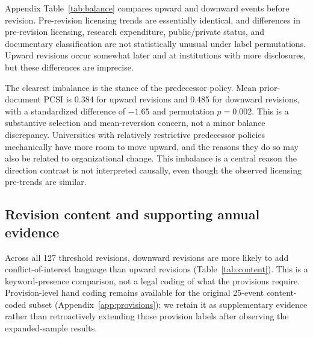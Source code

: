 Appendix Table~\ref{tab:balance} compares upward and downward events before revision. Pre-revision licensing trends are essentially identical, and differences in pre-revision licensing, research expenditure, public/private status, and documentary classification are not statistically unusual under label permutations. Upward revisions occur somewhat later and at institutions with more disclosures, but these differences are imprecise.

The clearest imbalance is the stance of the predecessor policy. Mean prior-document PCSI is 0.384 for upward revisions and 0.485 for downward revisions, with a standardized difference of $-1.65$ and permutation $p=0.002$. This is a substantive selection and mean-reversion concern, not a minor balance discrepancy. Universities with relatively restrictive predecessor policies mechanically have more room to move upward, and the reasons they do so may also be related to organizational change. This imbalance is a central reason the direction contrast is not interpreted causally, even though the observed licensing pre-trends are similar.

\subsection*{Revision content and supporting annual evidence}

Across all 127 threshold revisions, downward revisions are more likely to add conflict-of-interest language than upward revisions (Table~\ref{tab:content}). This is a keyword-presence comparison, not a legal coding of what the provisions require. Provision-level hand coding remains available for the original 25-event content-coded subset (Appendix~\ref{app:provisions}); we retain it as supplementary evidence rather than retroactively extending those provision labels after observing the expanded-sample results.

